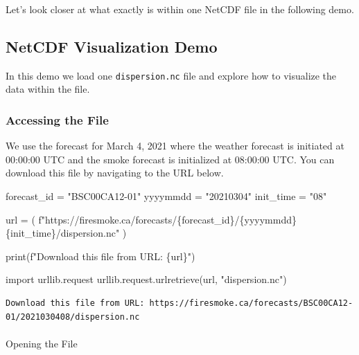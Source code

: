 \documentclass[
  letterpaper,
  DIV=11,
  numbers=noendperiod]{scrreprt}
\makeatletter
\let\oldparagraph\paragraph
\renewcommand{\paragraph}{
    \@ifstar
      \xxxParagraphStar
      \xxxParagraphNoStar
  }
\newcommand{\xxxParagraphStar}[1]{\oldparagraph*{#1}\mbox{}}
\newcommand{\xxxParagraphNoStar}[1]{\oldparagraph{#1}\mbox{}}
\newenvironment{Shaded}{\begin{snugshade}}{\end{snugshade}}
\newcommand{\BuiltInTok}[1]{\textcolor[rgb]{0.00,0.23,0.31}{#1}}
\newcommand{\ImportTok}[1]{\textcolor[rgb]{0.00,0.46,0.62}{#1}}
\newcommand{\NormalTok}[1]{\textcolor[rgb]{0.00,0.23,0.31}{#1}}
\newcommand{\OperatorTok}[1]{\textcolor[rgb]{0.37,0.37,0.37}{#1}}
\newcommand{\SpecialCharTok}[1]{\textcolor[rgb]{0.37,0.37,0.37}{#1}}
\newcommand{\SpecialStringTok}[1]{\textcolor[rgb]{0.13,0.47,0.30}{#1}}
\newcommand{\StringTok}[1]{\textcolor[rgb]{0.13,0.47,0.30}{#1}}
\makeatother
\begin{document}
Let's look closer at what exactly is within one NetCDF file in the
following demo.

\subsection{NetCDF Visualization Demo}\label{sec-netcdf-demo}

In this demo we load one \texttt{dispersion.nc} file and explore how to
visualize the data within the file.

\subsubsection{Accessing the File}\label{accessing-the-file}

We use the forecast for March 4, 2021 where the weather forecast is
initiated at 00:00:00 UTC and the smoke forecast is initialized at
08:00:00 UTC. You can download this file by navigating to the URL below.

\begin{Shaded}
\begin{Highlighting}[]
\NormalTok{forecast\_id }\OperatorTok{=} \StringTok{"BSC00CA12{-}01"}
\NormalTok{yyyymmdd }\OperatorTok{=} \StringTok{"20210304"}
\NormalTok{init\_time }\OperatorTok{=} \StringTok{"08"}

\NormalTok{url }\OperatorTok{=}\NormalTok{ (}
    \SpecialStringTok{f"https://firesmoke.ca/forecasts/}\SpecialCharTok{\{}\NormalTok{forecast\_id}\SpecialCharTok{\}}\SpecialStringTok{/}\SpecialCharTok{\{}\NormalTok{yyyymmdd}\SpecialCharTok{\}\{}\NormalTok{init\_time}\SpecialCharTok{\}}\SpecialStringTok{/dispersion.nc"}
\NormalTok{)}

\BuiltInTok{print}\NormalTok{(}\SpecialStringTok{f"Download this file from URL: }\SpecialCharTok{\{}\NormalTok{url}\SpecialCharTok{\}}\SpecialStringTok{"}\NormalTok{)}

\ImportTok{import}\NormalTok{ urllib.request}
\NormalTok{urllib.request.urlretrieve(url, }\StringTok{"dispersion.nc"}\NormalTok{)}
\end{Highlighting}
\end{Shaded}

\begin{verbatim}
Download this file from URL: https://firesmoke.ca/forecasts/BSC00CA12-01/2021030408/dispersion.nc
\end{verbatim}

\paragraph{Opening the File}\label{opening-the-file}
\end{document}
